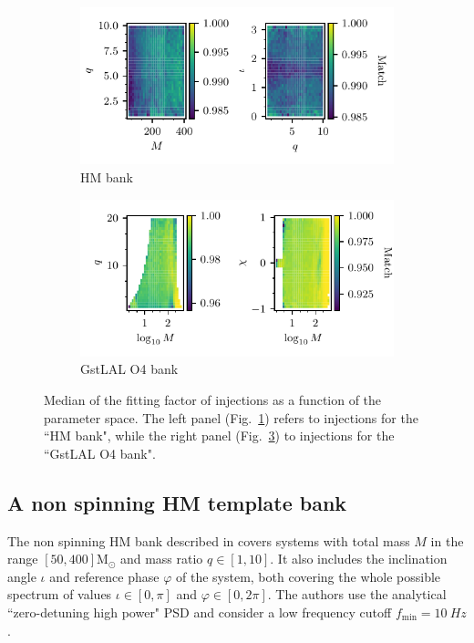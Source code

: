 \documentclass[twocolumn,showpacs,preprintnumbers,nofootinbib,prd,
superscriptaddress,10pt]{revtex4-2}
\begin{document}
\begin{figure}[t]
	\centering
	\begin{subfigure}[t]{0.49\textwidth}
		\includegraphics[scale = 1.]{symphony_HM_injections}
		\caption{HM bank \cite{Harry:2017weg}}
		\label{fig:symphony_HM_injections}
	\end{subfigure}
	\hfill
	\begin{subfigure}[t]{0.49\textwidth}
		\includegraphics[scale = 1.]{bank_O4_injections}
		\caption{GstLAL O4 bank \cite{Sakon:2022ibh}}
		\label{fig:bank_O4_injections}
	\end{subfigure}
	\caption{Median of the fitting factor of injections as a function of the parameter space. The left panel (Fig.~\ref{fig:symphony_HM_injections}) refers to injections for the ``HM bank", while the right panel (Fig.~\ref{fig:bank_O4_injections}) to injections for the ``GstLAL O4 bank".}
\end{figure}

\subsection{A non spinning HM template bank} \label{sec:HM_comparison}

The non spinning HM bank described in \cite{Harry:2017weg} covers systems with total mass $M$ in the range $[50, 400] \mathrm{M_\odot}$ and mass ratio $q\in [1,10]$. It also includes the inclination angle $\iota$ and reference phase $\varphi$ of the system, both covering the whole possible spectrum of values $\iota\in [0,\pi]$ and $\varphi\in [0,2\pi]$.
The authors use the analytical ``zero-detuning high power" PSD \cite{OLD_PSDs} and consider a low frequency cutoff $f_\text{min} = \SI{10}{Hz}$.
\end{document}
